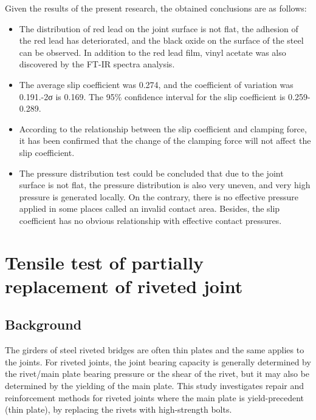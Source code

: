 Given the results of the present research, the obtained conclusions are as follows: 

\begin{itemize}
    \item The distribution of red lead on the joint surface is not flat, the adhesion of the red lead has deteriorated, and the black oxide on the surface of the steel can be observed. In addition to the red lead film, vinyl acetate was also discovered by the FT-IR spectra analysis. 

    \item The average slip coefficient was 0.274, and the coefficient of variation was 0.191.-2σ is 0.169. The 95\% confidence interval for the slip coefficient is 0.259-0.289. 

    \item According to the relationship between the slip coefficient and clamping force, it has been confirmed that the change of the clamping force will not affect the slip coefficient.

    \item The pressure distribution test could be concluded that due to the joint surface is not flat, the pressure distribution is also very uneven, and very high pressure is generated locally. On the contrary, there is no effective pressure applied in some places called an invalid contact area. Besides, the slip coefficient has no obvious relationship with effective contact pressures.
    
\end{itemize}

\section{Tensile test of partially replacement of riveted joint}

\subsection{Background}

The girders of steel riveted bridges are often thin plates and the same applies to the joints. For riveted joints, the joint bearing capacity is generally determined by the rivet/main plate bearing pressure or the shear of the rivet, but it may also be determined by the yielding of the main plate. This study investigates repair and reinforcement methods for riveted joints where the main plate is yield-precedent (thin plate), by replacing the rivets with high-strength bolts.

